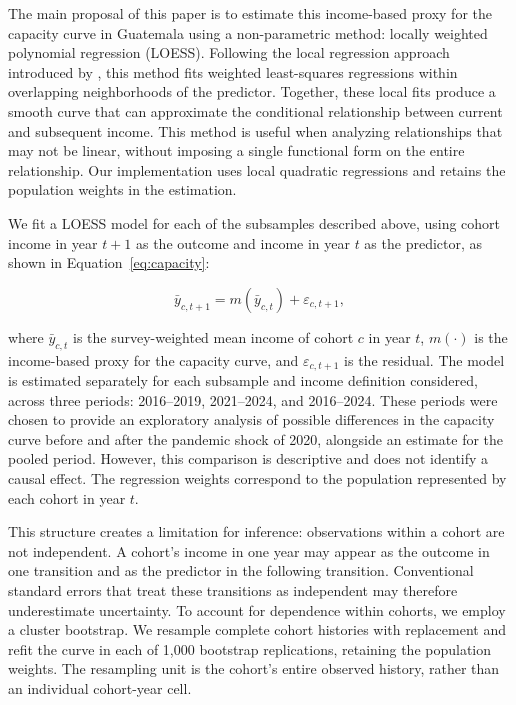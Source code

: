 \documentclass{article}
\begin{document}
The main proposal of this paper is to estimate this income-based proxy for the capacity curve in Guatemala using a non-parametric method: locally weighted polynomial regression (LOESS). Following the local regression approach introduced by \textcite{cleveland1979}, this method fits weighted least-squares regressions within overlapping neighborhoods of the predictor. Together, these local fits produce a smooth curve that can approximate the conditional relationship between current and subsequent income. This method is useful when analyzing relationships that may not be linear, without imposing a single functional form on the entire relationship. Our implementation uses local quadratic regressions and retains the population weights in the estimation.

We fit a LOESS model for each of the subsamples described above, using cohort income in year $t+1$ as the outcome and income in year $t$ as the predictor, as shown in Equation~\ref{eq:capacity}:

\begin{equation}
    \bar{y}_{c,t+1}
    =
    m(\bar{y}_{c,t})+\varepsilon_{c,t+1},
    \label{eq:capacity}
\end{equation}

where $\bar{y}_{c,t}$ is the survey-weighted mean income of cohort $c$ in year $t$, $m(\cdot)$ is the income-based proxy for the capacity curve, and $\varepsilon_{c,t+1}$ is the residual. The model is estimated separately for each subsample and income definition considered, across three periods: 2016--2019, 2021--2024, and 2016--2024. These periods were chosen to provide an exploratory analysis of possible differences in the capacity curve before and after the pandemic shock of 2020, alongside an estimate for the pooled period. However, this comparison is descriptive and does not identify a causal effect. The regression weights correspond to the population represented by each cohort in year $t$.

This structure creates a limitation for inference: observations within a cohort are not independent. A cohort's income in one year may appear as the outcome in one transition and as the predictor in the following transition. Conventional standard errors that treat these transitions as independent may therefore underestimate uncertainty. To account for dependence within cohorts, we employ a cluster bootstrap. We resample complete cohort histories with replacement and refit the curve in each of 1,000 bootstrap replications, retaining the population weights. The resampling unit is the cohort's entire observed history, rather than an individual cohort-year cell.
\end{document}
